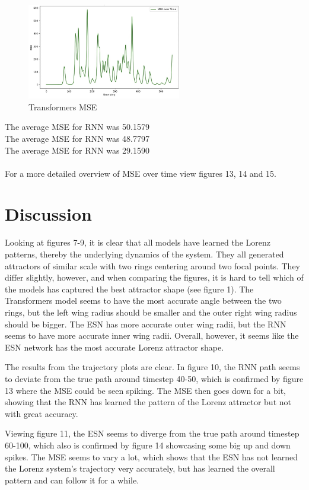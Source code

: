 \documentclass[11pt]{article}
\begin{document}
\begin{figure}[h]
\centering
\includegraphics[width=0.6\textwidth]{transformers_mse.jpeg}
\caption{Transformers MSE}
\end{figure}
The average MSE for RNN was 50.1579 \\
The average MSE for RNN was 48.7797 \\
The average MSE for RNN was 29.1590 \\ \\
For a more detailed overview of MSE over time view figures 13, 14 and 15.

\section{Discussion}
Looking at figures 7-9, it is clear that all models have learned the Lorenz patterns, thereby the underlying dynamics of the system. They all generated attractors of similar scale with two rings centering around two focal points. They differ slightly, however, and when comparing the figures, it is hard to tell which of the models has captured the best attractor shape (see figure 1). The Transformers model seems to have the most accurate angle between the two rings, but the left wing radius should be smaller and the outer right wing radius should be bigger. The ESN has more accurate outer wing radii, but the RNN seems to have more accurate inner wing radii. Overall, however, it seems like the ESN network has the most accurate Lorenz attractor shape.

The results from the trajectory plots are clear. In figure 10, the RNN path seems to deviate from the true path around timestep 40-50, which is confirmed by figure 13 where the MSE could be seen spiking. The MSE then goes down for a bit, showing that the RNN has learned the pattern of the Lorenz attractor but not with great accuracy.

Viewing figure 11, the ESN seems to diverge from the true path around timestep 60-100, which also is confirmed by figure 14 showcasing some big up and down spikes. The MSE seems to vary a lot, which shows that the ESN has not learned the Lorenz system's trajectory very accurately, but has learned the overall pattern and can follow it for a while.
\end{document}

